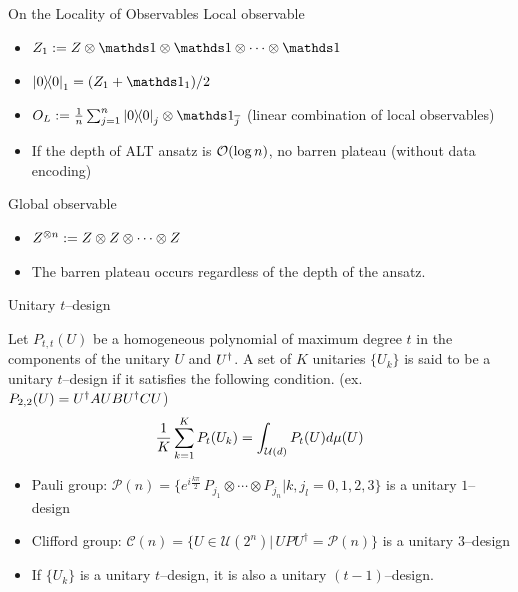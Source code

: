 \documentclass[dvipdfmx,10pt,aspectratio=169]{beamer}
\begin{document}
\appendix
\begin{frame}{On the Locality of Observables}
    Local observable
    \begin{itemize}
        \item $Z_1 := Z \ot \bbid \ot \bbid \ot \cdots \ot \bbid$
        \item $\dyad{0}_1 = (Z_1 + \bbid_1)/2$
        \item $O_L := \frac1n \sum_{j=1}^{n}\dyad{0}_{j} \otimes \bbid_{\bar{j}}$ (linear combination of local observables)
        \item If the depth of ALT ansatz is $\order{\log{n}}$, no barren plateau (without data encoding)
    \end{itemize}
    
    Global observable
    \begin{itemize}
        \item $Z^{\otimes {n}} := Z \otimes Z \otimes \cdots \otimes Z$
        \item The barren plateau occurs regardless of the depth of the ansatz.
    \end{itemize}
\end{frame}



\begin{frame}{Unitary $t$--design}
    \begin{definition}
        Let $P_{t,t}(U)$ be a homogeneous polynomial of maximum degree $t$ in the components of the unitary $U$ and $U^\dagger$. A set of $K$ unitaries $\{U_k\}$ is said to be a unitary $t$--design if it satisfies the following condition. (ex. $P_{2,2}(U) = U^\dagger AUBU^\dagger CU$)
        \begin{align*}
            \frac1K \sum_{k=1}^{K} P_{t}(U_k) = \int_{\mathcal{U}(d)}P_{t} (U) d\mu(U)
        \end{align*}
    \end{definition}
    
    \begin{itemize}
        \item Pauli group: $\mathcal{P}(n)=\{e^{i\frac{k\pi}{2}}\, P_{j_1}\otimes \cdots\otimes P_{j_n}| k,j_l=0,1,2,3\}$ is a unitary $1$--design
        \item Clifford group: $\mathcal{C}(n)=\{U\in \mathcal{U}(2^n)|\,UPU^\dagger = \mathcal{P}(n)\}$ is a unitary $3$--design
        \item If $\{U_k\}$ is a unitary $t$--design, it is also a unitary $(t-1)$--design.
    \end{itemize}
\end{frame}
\end{document}
